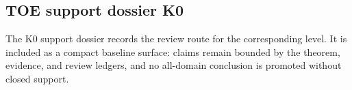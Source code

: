 \subsection{TOE support dossier K0}
The K0 support dossier records the review route for the corresponding level. It is included as a compact baseline surface: claims remain bounded by the theorem, evidence, and review ledgers, and no all-domain conclusion is promoted without closed support.
